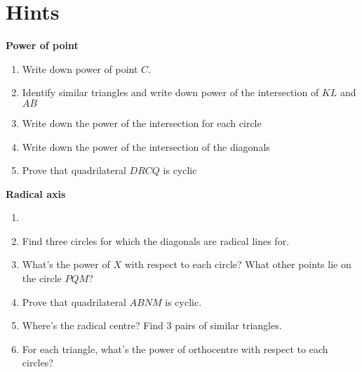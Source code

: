 \documentclass{article}
\begin{document}
\newpage
\section*{Hints}

\textbf{Power of point}

\begin{enumerate}
	\item Write down power of point $C$.
	\item Identify similar triangles and write down power of the intersection of $KL$ and $AB$
	\item Write down the power of the intersection for each circle
	\item Write down the power of the intersection of the diagonals
	\item Prove that quadrilateral $DRCQ$ is cyclic
\end{enumerate}

 \noindent
 \textbf{Radical axis}

\begin{enumerate}
	\item 
	\item Find three circles for which the diagonals are radical lines for.
	\item What's the power of $X$ with respect to each circle? What other points lie on the circle $PQM$?
	\item Prove that quadrilateral $ABNM$ is cyclic.
	\item Where's the radical centre? Find 3 pairs of similar triangles.
	\item For each triangle, what's the power of orthocentre with respect to each circles?
\end{enumerate}
\end{document}
